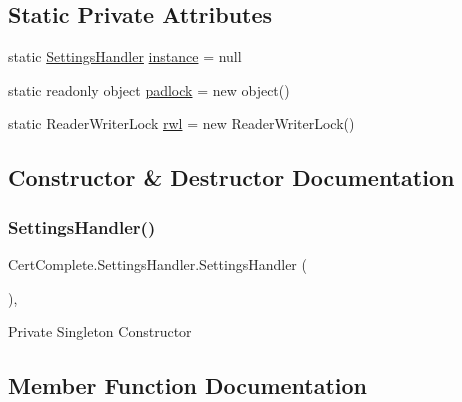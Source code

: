 \subsection*{Static Private Attributes}
\begin{DoxyCompactItemize}
\item 
static \mbox{\hyperlink{class_cert_complete_1_1_settings_handler}{Settings\+Handler}} \mbox{\hyperlink{class_cert_complete_1_1_settings_handler_a4aeaa8c6596fb57a409c1e54fc3fad45}{instance}} = null
\item 
static readonly object \mbox{\hyperlink{class_cert_complete_1_1_settings_handler_a08a886e39a75630726a54af44bcf826a}{padlock}} = new object()
\item 
static Reader\+Writer\+Lock \mbox{\hyperlink{class_cert_complete_1_1_settings_handler_a015ee72e931192b40c952cd47364d1f4}{rwl}} = new Reader\+Writer\+Lock()
\end{DoxyCompactItemize}


\subsection{Constructor \& Destructor Documentation}
\mbox{\label{class_cert_complete_1_1_settings_handler_a9bf5be6fa3187631488a9ffa46fc4b7f}} 
\subsubsection{\texorpdfstring{Settings\+Handler()}{SettingsHandler()}}
{\footnotesize\ttfamily Cert\+Complete.\+Settings\+Handler.\+Settings\+Handler (\begin{DoxyParamCaption}{ }\end{DoxyParamCaption})\hspace{0.3cm}{\ttfamily [inline]}, {\ttfamily [private]}}



Private Singleton Constructor 



\subsection{Member Function Documentation}
\mbox{\label{class_cert_complete_1_1_settings_handler_afe216c240ce24c1925eaa84b8f48348c}} 
